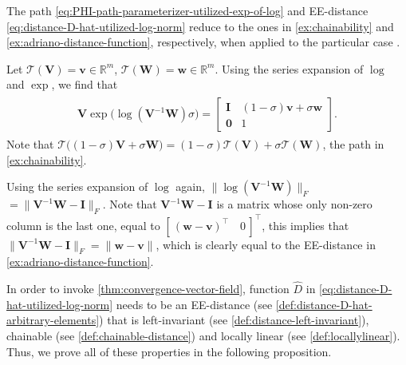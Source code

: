 \begin{remark}
    The path \eqref{eq:PHI-path-parameterizer-utilized-exp-of-log} and EE-distance \eqref{eq:distance-D-hat-utilized-log-norm} reduce to the ones in \cref{ex:chainability} and \cref{ex:adriano-distance-function}, respectively, when applied to the particular case .

    Let $\mathcal{T}(\mathbf{V}) = \mathbf{v}\in\mathbb{R}^m$, $\mathcal{T}(\mathbf{W}) = \mathbf{w}\in\mathbb{R}^m$. Using the series expansion of $\log$ and $\exp$, we find that
    \begin{align}
    \begin{split}
        \mathbf{V}\exp{\bigl(\log{(\mathbf{V}^{-1}\mathbf{W})}\sigma\bigr)} 
        = \begin{bmatrix}
            \mathbf{I} & (1 - \sigma)\mathbf{v} + \sigma \mathbf{w}\\ \mathbf{0} & 1
        \end{bmatrix}.
        \end{split}
    \end{align}
    Note that $\mathcal{T}\bigl((1 - \sigma)\mathbf{V} + \sigma\mathbf{W}\bigr) = (1 - \sigma)\mathcal{T}(\mathbf{V}) + \sigma \mathcal{T}(\mathbf{W})$, the path in \cref{ex:chainability}.

    Using the series expansion of $\log$ again, $\|\log{(\mathbf{V}^{-1}\mathbf{W})}\|_F$
    $= \|\mathbf{V}^{-1}\mathbf{W} - \mathbf{I}\|_F$. Note that $\mathbf{V}^{-1}\mathbf{W} - \mathbf{I}$ is a matrix whose only non-zero column is the last one, equal to $[\,(\mathbf{w} - \mathbf{v})^\top\quad 0\,]^\top$, this implies that $\|\mathbf{V}^{-1}\mathbf{W} - \mathbf{I}\|_F$$=\|\mathbf{w}-\mathbf{v}\|$, which is clearly equal to the EE-distance in \cref{ex:adriano-distance-function}. 
\end{remark}

In order to invoke \cref{thm:convergence-vector-field}, function $\widehat{D}$ in \eqref{eq:distance-D-hat-utilized-log-norm} needs to be an EE-distance (see \cref{def:distance-D-hat-arbitrary-elements}) that is left-invariant (see \cref{def:distance-left-invariant}), chainable (see \cref{def:chainable-distance}) and locally linear (see \cref{def:locallylinear}). Thus, we prove all of these properties in the following proposition.

